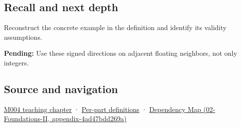 \subsection{Recall and next depth}\label{recall-and-next-depth}

Reconstruct the concrete example in the definition and identify its validity assumptions.

\textbf{Pending:} Use these signed directions on adjacent floating neighbors, not only integers.

\subsection{Source and navigation}\label{source-and-navigation}

\href{Continuous\%20Notes/Computing\%20Foundations\%20-\%20From\%20Bits\%20to\%20C++\%20and\%20Systems\%20APIs\#A\%20stretching\%20ruler\%20for\%20real-valued\%20quantities}{M004 teaching chapter} · \hyperref[appendix-fd090d982a15]{Per-part definitions} · \href{}{Dependency Map (02-Foundations-II, appendix-4ad47bdd269a)}
